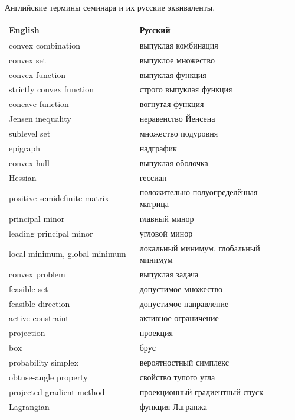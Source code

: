 \documentclass[11pt,a4paper]{article}
\begin{document}
Английские термины семинара и их русские эквиваленты.

\begin{longtable}{@{}>{\raggedright\arraybackslash}p{0.44\linewidth}>{\raggedright\arraybackslash}p{0.52\linewidth}@{}}
\toprule
\textbf{English} & \textbf{Русский} \\
\midrule
\endhead
\bottomrule
\endlastfoot
\textenglish{convex combination} & выпуклая комбинация \\
\textenglish{convex set} & выпуклое множество \\
\textenglish{convex function} & выпуклая функция \\
\textenglish{strictly convex function} & строго выпуклая функция \\
\textenglish{concave function} & вогнутая функция \\
\textenglish{Jensen inequality} & неравенство Йенсена \\
\textenglish{sublevel set} & множество подуровня \\
\textenglish{epigraph} & надграфик \\
\textenglish{convex hull} & выпуклая оболочка \\
\textenglish{Hessian} & гессиан \\
\textenglish{positive semidefinite matrix} & положительно полуопределённая матрица \\
\textenglish{principal minor} & главный минор \\
\textenglish{leading principal minor} & угловой минор \\
\textenglish{local minimum, global minimum} & локальный минимум, глобальный минимум \\
\textenglish{convex problem} & выпуклая задача \\
\textenglish{feasible set} & допустимое множество \\
\textenglish{feasible direction} & допустимое направление \\
\textenglish{active constraint} & активное ограничение \\
\textenglish{projection} & проекция \\
\textenglish{box} & брус \\
\textenglish{probability simplex} & вероятностный симплекс \\
\textenglish{obtuse-angle property} & свойство тупого угла \\
\textenglish{projected gradient method} & проекционный градиентный спуск \\
\textenglish{Lagrangian} & функция Лагранжа \\

\end{longtable}
\end{document}

